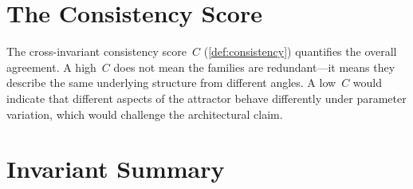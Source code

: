 \documentclass[11pt,twoside,openright]{book}
\theoremstyle{definition}
\theoremstyle{plain}
\theoremstyle{definition}
\theoremstyle{remark}
\begin{document}
\section{The Consistency Score}

The cross-invariant consistency score~\(C\) (\cref{def:consistency}) quantifies the overall agreement. A high~\(C\) does not mean the families are redundant---it means they describe the same underlying structure from different angles. A low~\(C\) would indicate that different aspects of the attractor behave differently under parameter variation, which would challenge the architectural claim.

\section{Invariant Summary}
\end{document}

